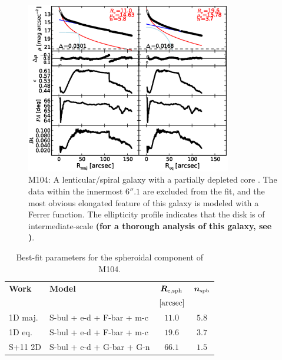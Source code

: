 \documentclass[preprint2]{emulateapj}
\newcommand{\fitfigurewidth}{0.8\textwidth}
\begin{document}
  \begin{figure}[h]
  \begin{center}
  \includegraphics[width=\fitfigurewidth]{images/m104_1Dfit.eps}
  \caption{M104: 
  A lenticular/spiral galaxy with a partially depleted core \citep{jardel2011}. 
  The data within the innermost $6''.1$ are excluded from the fit, 
  and the most obvious elongated feature of this galaxy is modeled with a Ferrer function. 
  The ellipticity profile indicates that the disk is of intermediate-scale 
  {\bf (for a thorough analysis of this galaxy, see \citealt{gadottisanchezjanssen2012})}.
  }
  \end{center}
  \end{figure}
  
  \begin{table}[h]
  \small
  \caption{Best-fit parameters for the spheroidal component of M104.}
  \begin{center}
  \begin{tabular}{llcc}
  \hline
  {\bf Work} & {\bf Model}   & $\bm R_{\rm e,sph}$    & $\bm n_{\rm sph}$ \\
    &  &  $[\rm arcsec]$ & \\
  \hline
  1D maj. & S-bul + e-d + F-bar + m-c  & $11.0$  &  $5.8$ \\
  1D eq.  & S-bul + e-d + F-bar + m-c  & $19.6$  &  $3.7$ \\
  \hline
  S+11 2D         & S-bul + e-d + G-bar + G-n  & $66.1$  &  $1.5$ \\
  \hline
  \end{tabular}
  \end{center}
  \label{tab:m104}
  \end{table}
\end{document}
